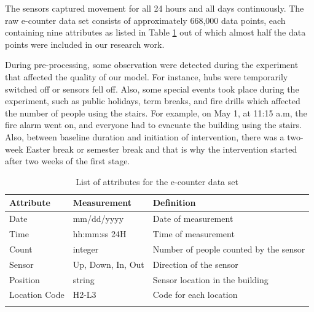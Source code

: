 The sensors captured movement for all 24 hours and all days continuously. The raw e-counter data set consists of approximately 668,000 data points, each containing nine attributes as listed in Table \ref{attr} out of which almost half the data points were included in our research work. 








During pre-processing, some observation were detected during the experiment that affected the quality of our model. For instance, hubs were temporarily switched off or sensors fell off. Also, some special events took place during the experiment, such as public holidays, term breaks, and fire drills which affected the number of people using the stairs. For example, on May 1, at 11:15 a.m, the fire alarm went on, and everyone had to evacuate the building using the stairs. Also, between baseline duration and initiation of intervention, there was a two-week Easter break or semester break and that is why the intervention started after two weeks of the first stage.



\begin{table}[!ht]
\centering
\caption{List of attributes for the e-counter data set}

    \begin{tabular}{p{2cm} p{3.5cm}  p{4.5cm} }
    \hline
    \textbf{Attribute} & \textbf{Measurement} & \textbf{Definition}\\ \hline
    \midrule
Date             &  mm/dd/yyyy      &   Date of measurement                                 \\\hline
Time             &  hh:mm:ss 24H    &   Time of measurement                                 \\\hline
Count            &  integer         &   Number of people counted by the sensor              \\ \hline
Sensor           &  Up, Down, In, Out & Direction of the sensor             \\ \hline
Position         &    string         &   Sensor location in the building                                                                                                      \\ \hline
Location Code    &     H2-L3             & Code for each location                                                                                                                                       \\ \hline
    \bottomrule
    \label{attr}
\end{tabular}
\end{table}



